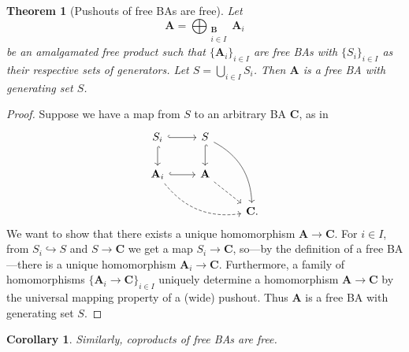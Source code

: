 \documentclass{article}
\newtheorem{theorem}{Theorem}
\newtheorem{corollary}{Corollary}
\theoremstyle{definition}
\theoremstyle{remark}
\begin{document}
\begin{theorem}[Pushouts of free BAs are free]
  Let
  \[
    \mathbf{A} = \bigoplus_{\substack{\mathbf{B}\\ i \in I}} \mathbf{A}_i
  \]
  be an amalgamated free product such that $\{ \mathbf{A}_{i} \}_{i \in I}$ are
  free BAs with $\{ S_i \}_{i \in I}$ as their respective sets of generators.
  Let $S = \bigcup_{i \in I} S_i$. Then $\mathbf{A}$ is a free BA with
  generating set $S$.
\end{theorem}
\begin{proof}
  Suppose we have a map from $S$ to an arbitrary BA $\mathbf{C}$, as in
  \[
    \begin{tikzcd}
      S_i \ar[r,hookrightarrow] \ar[d,hookrightarrow] & S \ar[d,hookrightarrow]
      \ar[ddr,bend left] & \\
      \mathbf{A}_i \ar[r,hookrightarrow] \ar[rrd,dashed,bend right] & \mathbf{A}
      \ar[rd,dashed]& \\
      & & \mathbf{C}.
    \end{tikzcd}
  \]
  We want to show that there exists a unique homomorphism $\mathbf{A} \to
  \mathbf{C}$. For $i \in I$, from $S_i \hookrightarrow S$ and $S \to
  \mathbf{C}$ we get a map $S_i \to \mathbf{C}$, so---by the definition of a
  free BA---there is a unique homomorphism $\mathbf{A}_i \to \mathbf{C}$.
  Furthermore, a family of homomorphisms $\{ \mathbf{A}_i \to \mathbf{C} \}_{i
    \in I}$ uniquely determine a homomorphism $\mathbf{A} \to \mathbf{C}$ by the
  universal mapping property of a (wide) pushout. Thus $\mathbf{A}$ is a free BA
  with generating set $S$.
\end{proof}

\begin{corollary}
  Similarly, coproducts of free BAs are free.
\end{corollary}



\end{document}
